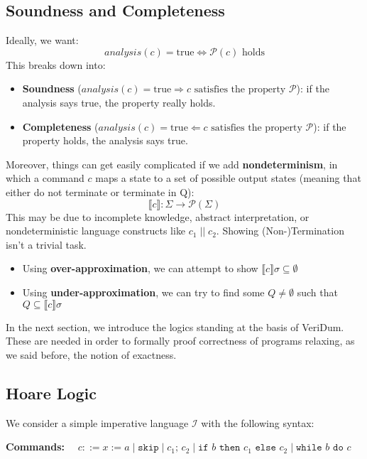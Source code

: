 \documentclass[parskip=half]{scrartcl}
\begin{document}
\subsection{Soundness and Completeness}

Ideally, we want:
\[
analysis(c) = \text{true} \iff \mathcal{P}(c) \text{ holds}
\]
This breaks down into:
\begin{itemize}
    \item \textbf{Soundness} ($analysis(c) = \text{true} \Rightarrow c \text{ satisfies the property } \mathcal{P}$): if the analysis says true, the property really holds.
    \item \textbf{Completeness} ($analysis(c) = \text{true} \Leftarrow c \text{ satisfies the property } \mathcal{P}$): if the property holds, the analysis says true.
\end{itemize}

Moreover, things can get easily complicated if we add \textbf{nondeterminism}, in which a command \( c \) maps a state to a set of possible output states (meaning that either do not terminate or terminate in Q):
\[
\llbracket c \rrbracket : \Sigma \rightarrow \mathcal{P}(\Sigma)
\]
This may be due to incomplete knowledge, abstract interpretation, or nondeterministic language constructs like \( c_1 \; \vert\vert \; c_2 \).
Showing (Non-)Termination isn't a trivial task. 
\begin{itemize}
    \item Using \textbf{over-approximation}, we can attempt to show \( \llbracket c \rrbracket \sigma \subseteq \emptyset \)
    \item Using \textbf{under-approximation}, we can try to find some \( Q \ne \emptyset \) such that \( Q \subseteq \llbracket c \rrbracket \sigma \)
\end{itemize}

In the next section, we introduce the logics standing at the basis of VeriDum. These are needed in order to formally proof correctness of programs relaxing, as we said before, the notion of exactness. 

\subsection{Hoare Logic}
We consider a simple imperative language $\mathcal{I}$ with the following syntax:

\textbf{Commands:} $\quad c ::= x := a \mid \texttt{skip} \mid c_1;\,c_2 \mid \texttt{if } b \texttt{ then } c_1 \texttt{ else } c_2 \mid \texttt{while } b \texttt{ do } c$
\end{document}
